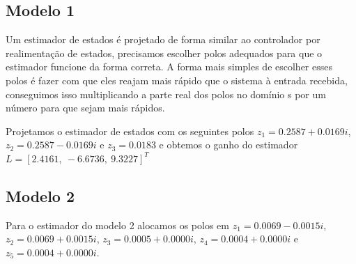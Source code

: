 \subsection{Modelo 1}
Um estimador de estados é projetado de forma similar ao controlador por realimentação de estados, precisamos escolher polos adequados para que o estimador funcione da forma correta. A forma mais simples de escolher esses polos é fazer com que eles reajam mais rápido que o sistema à entrada recebida, conseguimos isso multiplicando a parte real dos polos no domínio s por um número para que sejam mais rápidos. 


Projetamos o estimador de estados com os seguintes polos $z_1=0.2587+0.0169 i$, $z_2=0.2587-0.0169 i$ e $z_3=0.0183$ e obtemos o ganho do estimador $L=[2.4161,~-6.6736,~9.3227]^T$

\subsection{Modelo 2}
Para o estimador do modelo 2 alocamos os polos em $z_1=0.0069 - 0.0015i$, $z_2=0.0069 + 0.0015i$, $z_3=0.0005 + 0.0000i$, $z_4=0.0004 + 0.0000i$ e $z_5=0.0004 + 0.0000i$.




















